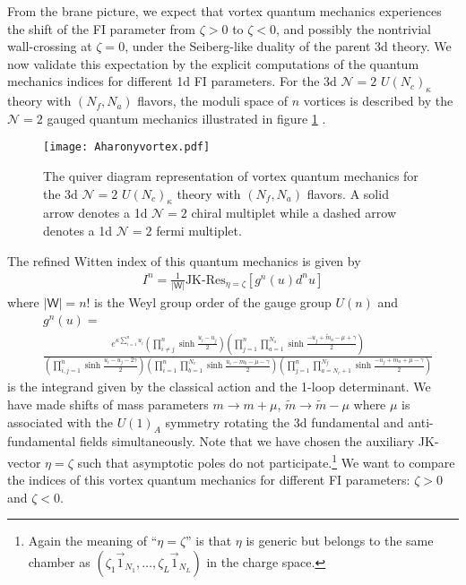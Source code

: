 \documentclass[a4paper,11pt]{article}
\begin{document}
From the brane picture, we expect that vortex quantum mechanics experiences the shift of the FI parameter from $\zeta > 0$ to $\zeta < 0$, and possibly the nontrivial wall-crossing at $\zeta = 0$, under the Seiberg-like duality of the parent 3d theory. We now validate this expectation by the explicit computations of the quantum mechanics indices for different 1d FI parameters. For the 3d $\mathcal N = 2$ $U(N_c)_\kappa$ theory with $(N_f,N_a)$ flavors, the moduli space of $n$ vortices is described by the $\mathcal N = 2$ gauged quantum mechanics illustrated in figure \ref{fig:Aharony vortex} \cite{Fujitsuka:2013fga}.
%
\begin{figure}[tbp]
\centering %
\texttt{[image: Aharonyvortex.pdf]}
\caption{\label{fig:Aharony vortex} The quiver diagram representation of vortex quantum mechanics for the 3d $\mathcal N = 2$ $U(N_c)_\kappa$ theory with $(N_f,N_a)$ flavors. A solid arrow denotes a 1d $\mathcal N = 2$ chiral multiplet while a dashed arrow denotes a 1d $\mathcal N = 2$ fermi multiplet.}
\end{figure}
%
The refined Witten index of this quantum mechanics is given by
\begin{align}
\label{eq:Aharony ind}
I^n = \frac{1}{|\mathsf W|} \text{JK-Res}_{\eta = \zeta} \left[g^n(u) d^n u\right]
\end{align}
where $|\mathsf W| = n!$ is the Weyl group order of the gauge group $U(n)$ and
\begin{align}
\label{eq:Aharony 1-loop}
& g^n(u) = \nonumber \\
& \frac{e^{\kappa \sum_{i = 1}^n u_i} \left(\prod_{i \neq j}^n \sinh \frac{u_i-u_j}{2}\right) \left(\prod_{j = 1}^n \prod_{a = 1}^{N_a} \sinh \frac{-u_j+\tilde m_a-\mu+\gamma}{2}\right)}{\left(\prod_{i,j = 1}^n \sinh \frac{u_i-u_j-2 \gamma}{2}\right) \left(\prod_{i = 1}^n \prod_{b = 1}^{N_c} \sinh \frac{u_i-m_b-\mu-\gamma}{2}\right) \left(\prod_{j = 1}^n \prod_{a = N_c+1}^{N_f} \sinh \frac{-u_j+m_a+\mu-\gamma}{2}\right)}
\end{align}
is the integrand given by the classical action and the 1-loop determinant. We have made shifts of mass parameters $m \rightarrow m+\mu$, $\tilde m \rightarrow \tilde m-\mu$ where $\mu$ is associated with the $U(1)_A$ symmetry rotating the 3d fundamental and anti-fundamental fields simultaneously. Note that we have chosen the auxiliary JK-vector $\eta = \zeta$ such that asymptotic poles do not participate.\footnote{Again the meaning of ``$\eta = \zeta$'' is that $\eta$ is generic but belongs to the same chamber as $(\zeta_1 \vec 1_{N_1},\ldots,\zeta_L \vec 1_{N_L})$ in the charge space.} We want to compare the indices of this vortex quantum mechanics for different FI parameters: $\zeta > 0$ and $\zeta < 0$.
\end{document}

